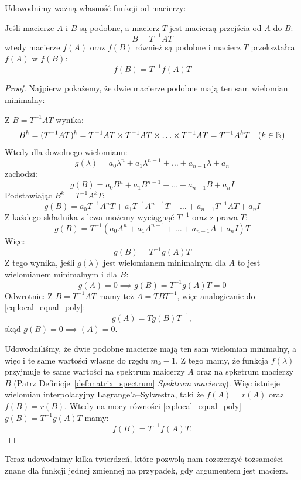 Udowodnimy ważną własność funkcji od macierzy:
\begin{theorem}\label{theorem:similar_matrix_functions}
    Jeśli macierze $A$ i $B$ są podobne, a macierz $T$ jest macierzą przejścia od $A$ do $B$:
    $$ B = T^{-1}AT $$
    wtedy macierze $f(A)$ oraz $f(B)$ również są podobne i macierz $T$ przekształca $f(A)$ w $f(B)$:
    $$f(B) = T^{-1}f(A)T$$
\end{theorem}
\begin{proof}
Najpierw pokażemy, że dwie macierze podobne mają ten sam wielomian minimalny:

Z $B = T^{-1}AT$ wynika:
$$
B^{k} = (T^{-1}AT)^{k} = T^{-1}AT \times T^{-1}AT \times \ldots \times T^{-1}AT = T^{-1}A^{k}T \quad (k \in \mathbb{N})
$$
Wtedy dla dowolnego wielomianu:
$$
    g(\lambda) = a_0\lambda^{n} + a_1\lambda^{n - 1} + \ldots + a_{n - 1}\lambda + a_n 
$$
zachodzi:
$$
g(B) = a_0B^{n} + a_1B^{n - 1} + \ldots + a_{n - 1}B + a_nI
$$
Podstawiając $B^{k} = T^{-1}A^{k}T$:
$$
g(B) = a_0T^{-1}A^{n}T + a_1T^{-1}A^{n - 1}T + \ldots + a_{n - 1}T^{-1}AT + a_nI
$$
Z każdego składnika z lewa możemy wyciągnąć $T^{-1}$ oraz z prawa $T$:
$$g(B) = T^{-1}(a_0A^{n} + a_1A^{n-1} + \ldots + a_{n - 1}A + a_nI)T$$
Więc:
\begin{equation}\label{eq:local_equal_poly}
    g(B) = T^{-1}g(A)T
\end{equation}
Z tego wynika, jeśli $g(\lambda)$ jest wielomianem minimalnym dla $A$ to jest wielomianem minimalnym i dla $B$:
$$ g(A) = 0 \implies g(B) = T^{-1}g(A)T = 0$$
Odwrotnie: Z $B = T^{-1}AT$ mamy też $A = TBT^{-1}$, więc analogicznie do \eqref{eq:local_equal_poly}:
$$g(A) = Tg(B)T^{-1},$$ 
skąd $g(B) = 0 \implies (A) = 0$.

Udowodniliśmy, że dwie podobne macierze mają ten sam wielomian minimalny, a więc i te same wartości własne do rzędu $m_k - 1$. Z tego mamy, że funkcja $f(\lambda)$ przyjmuje te same wartości na spektrum maicerzy $A$ oraz na spketrum macierzy $B$ (Patrz Definicje~\ref{def:matrix_spectrum} \textit{Spektrum macierzy}). Więc istnieje wielomian interpolacyjny Lagrange'a--Sylwestra, taki że $f(A) = r(A)$ oraz $f(B) = r(B)$. Wtedy na mocy równości \eqref{eq:local_equal_poly} $g(B) = T^{-1}g(A)T$ mamy:
$$f(B) = T^{-1}f(A)T.$$
\end{proof}

Teraz udowodnimy kilka twierdzeń, które pozwolą nam rozszerzyć tożsamości znane dla funkcji jednej zmiennej na przypadek, gdy argumentem jest macierz.

